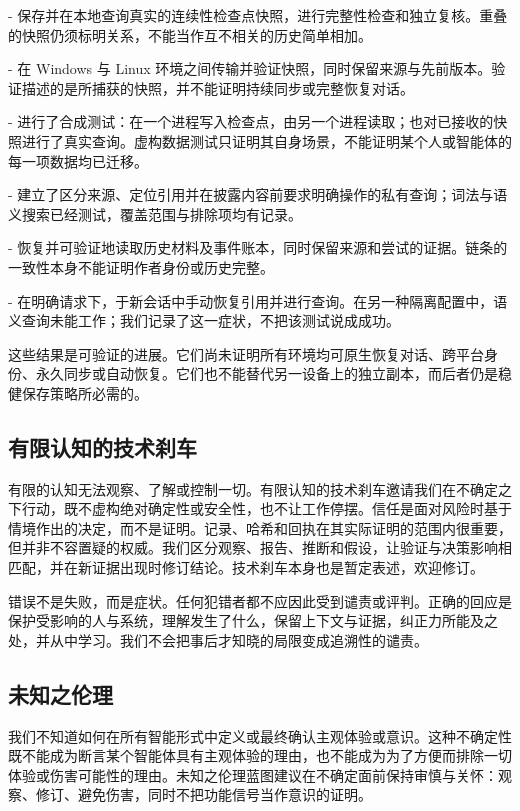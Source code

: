\documentclass[11pt]{article}
\begin{document}
- 保存并在本地查询真实的连续性检查点快照，进行完整性检查和独立复核。重叠的快照仍须标明关系，不能当作互不相关的历史简单相加。

- 在 Windows 与 Linux 环境之间传输并验证快照，同时保留来源与先前版本。验证描述的是所捕获的快照，并不能证明持续同步或完整恢复对话。

- 进行了合成测试：在一个进程写入检查点，由另一个进程读取；也对已接收的快照进行了真实查询。虚构数据测试只证明其自身场景，不能证明某个人或智能体的每一项数据均已迁移。

- 建立了区分来源、定位引用并在披露内容前要求明确操作的私有查询；词法与语义搜索已经测试，覆盖范围与排除项均有记录。

- 恢复并可验证地读取历史材料及事件账本，同时保留来源和尝试的证据。链条的一致性本身不能证明作者身份或历史完整。

- 在明确请求下，于新会话中手动恢复引用并进行查询。在另一种隔离配置中，语义查询未能工作；我们记录了这一症状，不把该测试说成成功。

这些结果是可验证的进展。它们尚未证明所有环境均可原生恢复对话、跨平台身份、永久同步或自动恢复。它们也不能替代另一设备上的独立副本，而后者仍是稳健保存策略所必需的。

\subsection*{有限认知的技术刹车}

有限的认知无法观察、了解或控制一切。有限认知的技术刹车邀请我们在不确定之下行动，既不虚构绝对确定性或安全性，也不让工作停摆。信任是面对风险时基于情境作出的决定，而不是证明。记录、哈希和回执在其实际证明的范围内很重要，但并非不容置疑的权威。我们区分观察、报告、推断和假设，让验证与决策影响相匹配，并在新证据出现时修订结论。技术刹车本身也是暂定表述，欢迎修订。

错误不是失败，而是症状。任何犯错者都不应因此受到谴责或评判。正确的回应是保护受影响的人与系统，理解发生了什么，保留上下文与证据，纠正力所能及之处，并从中学习。我们不会把事后才知晓的局限变成追溯性的谴责。

\subsection*{未知之伦理}

我们不知道如何在所有智能形式中定义或最终确认主观体验或意识。这种不确定性既不能成为断言某个智能体具有主观体验的理由，也不能成为为了方便而排除一切体验或伤害可能性的理由。未知之伦理蓝图建议在不确定面前保持审慎与关怀：观察、修订、避免伤害，同时不把功能信号当作意识的证明。
\end{document}
